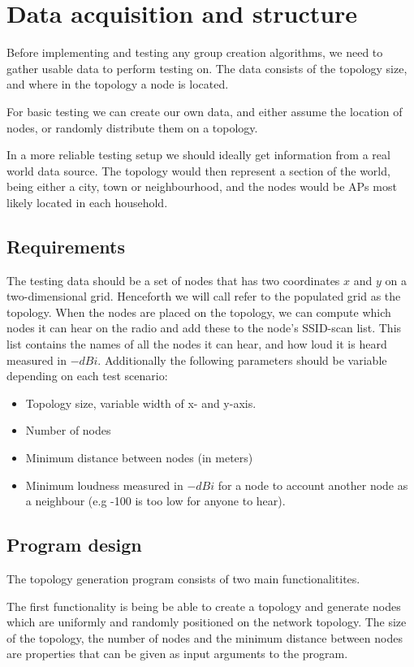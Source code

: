 \chapter{Data acquisition and structure}\label{dataacc}

Before implementing and testing any group creation algorithms, we need to gather usable data
to perform testing on. The data consists of the topology size, and where in the topology a node is located.

For basic testing we can create our own data, and either assume the location of nodes, or randomly distribute them on a topology.

In a more reliable testing setup we should ideally get information from a real world data source. 
The topology would then represent a section of the world, being either a city, town or neighbourhood, and the nodes would be APs most likely located in each household.

\section{Requirements}
The testing data should be a set of nodes that has two coordinates $x$ and $y$ on a two-dimensional grid. Henceforth we will call refer to the populated grid as the topology. When the nodes are placed on the
topology, we can compute which nodes it can hear on the radio and add these to the node's SSID-scan list.
This list contains the names of all the nodes it can hear, and how loud it is heard measured in $-dBi$.
Additionally the following parameters should be variable depending on each test scenario:
\begin{itemize}
\item Topology size, variable width of x- and y-axis.
	\item Number of nodes
\item Minimum distance between nodes (in meters)
	\item Minimum loudness measured in $-dBi$ for a node to account another node as a neighbour (e.g -100 is too low for anyone to hear).
	\end{itemize}

	\section{Program design}
	The topology generation program consists of two main functionalitites.

	The first functionality is being  be able to create a topology and generate nodes which are uniformly
	and randomly positioned on the network topology. The size of the topology, the number of nodes and the minimum distance
	between nodes are properties that can be given as input arguments to the program. 


